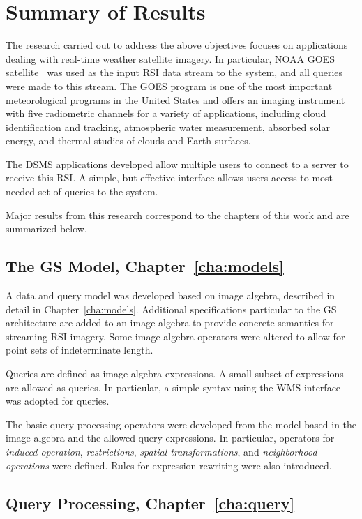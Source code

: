 \documentclass{ucdthesis}       %
\begin{document}
\section{Summary of Results}

The research carried out to address the above objectives focuses on
applications dealing with real-time weather satellite imagery.  In
particular, \acf{NOAA} \acf{GOES} satellite~\cite{goes96databook} was
used as the input \ac{RSI} data stream to the system, and all queries
were made to this stream.  The \ac{GOES} program is one of the most
important meteorological programs in the United States and offers an
imaging instrument with five radiometric channels for a variety of
applications, including cloud identification and tracking, atmospheric
water measurement, absorbed solar energy, and thermal studies of
clouds and Earth surfaces.

The \ac{DSMS} applications developed allow multiple users to connect
to a server to receive this \ac{RSI}.  A simple, but effective
interface allows users access to most needed set of queries to the
system.

Major results from this research correspond to the chapters of this
work and are summarized below.

\subsection*{The \ac{GS} Model, Chapter~\ref{cha:models}}

A data and query model was developed based on image algebra, described
in detail in Chapter~\ref{cha:models}.  Additional specifications
particular to the \ac{GS} architecture are added to an image algebra
to provide concrete semantics for streaming \ac{RSI} imagery.  Some
image algebra operators were altered to allow for point sets of
indeterminate length.

Queries are defined as image algebra expressions.  A small subset of
expressions are allowed as queries.  In particular, a simple syntax
using the \acf{WMS} interface was adopted for queries.

The basic query processing operators were developed from the model
based in the image algebra and the allowed query expressions.  In
particular, operators for \emph{induced operation},
\emph{restrictions}, \emph{spatial transformations}, and
\emph{neighborhood operations} were defined.  Rules for expression
rewriting were also introduced.


\subsection*{Query Processing, Chapter~\ref{cha:query}}
\end{document}
